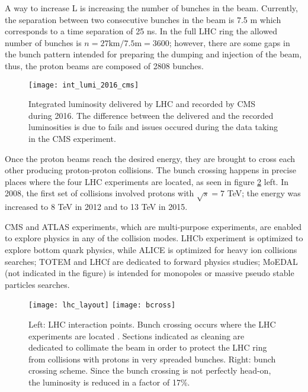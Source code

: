 \noindent A way to increase L is increasing the number of bunches in the beam. Currently, the separation between two consecutive bunches in the beam is 7.5 m which corresponds to a time separation of 25 ns. In the full LHC ring the allowed number of bunches is $n=27\textrm{km}/7.5\textrm{m}=3600$; however, there are some gaps in the bunch pattern intended for preparing the dumping and injection of the beam, thus, the proton beams are composed of 2808 bunches. 

\begin{figure}[!h]
\centering
\texttt{[image: int\_lumi\_2016\_cms]}
\caption [Integrated luminosity delivered by LHC and recorded by CMS during 2016]{Integrated luminosity delivered by LHC and recorded by CMS during 2016. The difference between the delivered and the recorded luminosities is due to fails and issues occured during the data taking in the CMS experiment\cite{lumi}.}\label{fig:lumi}
\end{figure}

\noindent Once the proton beams reach the desired energy, they are brought to cross each other producing proton-proton collisions. The bunch crossing happens in precise places where the four LHC experiments are located, as seen in figure \ref{fig:lhc_layout} left. In 2008, the first set of collisions involved protons with $\sqrt{s}=7$ TeV; the energy was increased to 8 TeV in 2012 and to 13 TeV in 2015.

\noindent CMS and ATLAS experiments, which are multi-purpose experiments, are enabled to explore physics in any of the collision modes. LHCb experiment is optimized to explore bottom quark physics, while ALICE is optimized for heavy ion collisions searches; TOTEM and LHCf are dedicated to forward physics studies; MoEDAL (not indicated in the figure) is intended for monopoles or massive pseudo stable particles searches.

\begin{figure}[!h]
\centering
\texttt{[image: lhc\_layout]}
\texttt{[image: bcross]}
\caption [LHC interaction points]{Left: LHC interaction points. Bunch crossing occurs where the LHC experiments are located \cite{lhc_layout}. Sections indicated as cleaning are dedicated to collimate the beam in order to protect the LHC ring from collisions with protons in very spreaded bunches. Right: bunch crossing scheme. Since the bunch crossing is not perfectly head-on, the luminosity is reduced in a factor of 17\%.}\label{fig:lhc_layout}
\end{figure}

